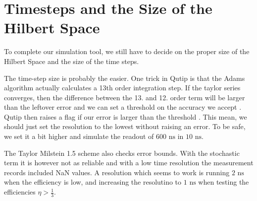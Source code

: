 







\section{Timesteps and the Size of the Hilbert Space}
To complete our simulation tool, we still have to decide on the proper size of the Hilbert Space and the size of the time steps. 

The time-step size is probably the easier. One trick in Qutip is that the Adams algorithm actually calculates a 13th order integration step. If the taylor series converges, then the difference between the 13. and 12. order term will be larger than the leftover error and we can set a threshold on the accuracy we accept \cite{KALKULUS}. Qutip then raises a flag if our error is larger than the threshold \cite{johansson_qutip_2012}. This mean, we should just set the resolution to the lowest without raising an error. To be safe, we set it a bit higher and simulate the readout of $600 \text{ ns}$ in $10 \text{ ns}$. 

The Taylor Milstein 1.5 scheme also checks error bounds. With the stochastic term it is however not as reliable and with a low time resolution the measurement records included NaN values. A resolution which seems to work is running $2 \text{ ns}$ when the efficiency is low, and increasing the resolutino to $1 \text{ ns}$ when testing the efficiencies $\eta > \frac13$. 

